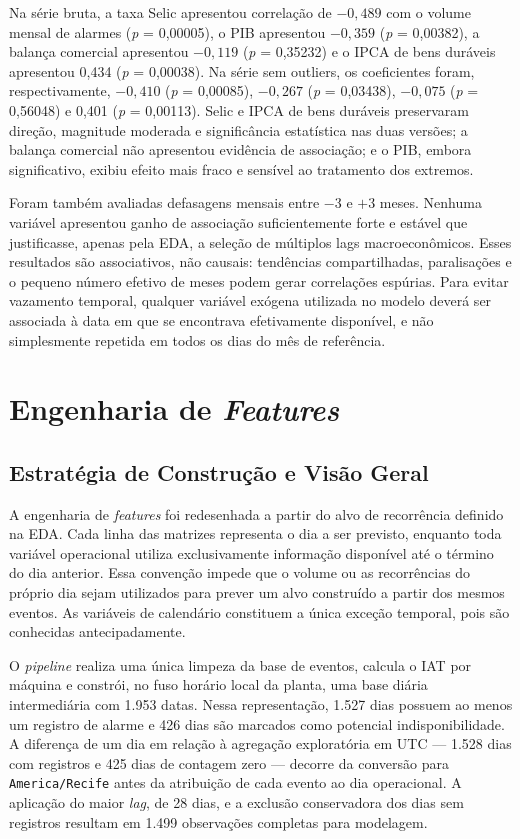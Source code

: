 Na série bruta, a taxa Selic apresentou correlação de $-0{,}489$ com o volume mensal de alarmes (\textit{p} = 0,00005), o PIB apresentou $-0{,}359$ (\textit{p} = 0,00382), a balança comercial apresentou $-0{,}119$ (\textit{p} = 0,35232) e o IPCA de bens duráveis apresentou 0,434 (\textit{p} = 0,00038). Na série sem outliers, os coeficientes foram, respectivamente, $-0{,}410$ (\textit{p} = 0,00085), $-0{,}267$ (\textit{p} = 0,03438), $-0{,}075$ (\textit{p} = 0,56048) e 0,401 (\textit{p} = 0,00113). Selic e IPCA de bens duráveis preservaram direção, magnitude moderada e significância estatística nas duas versões; a balança comercial não apresentou evidência de associação; e o PIB, embora significativo, exibiu efeito mais fraco e sensível ao tratamento dos extremos.

Foram também avaliadas defasagens mensais entre $-3$ e $+3$ meses. Nenhuma variável apresentou ganho de associação suficientemente forte e estável que justificasse, apenas pela EDA, a seleção de múltiplos lags macroeconômicos. Esses resultados são associativos, não causais: tendências compartilhadas, paralisações e o pequeno número efetivo de meses podem gerar correlações espúrias. Para evitar vazamento temporal, qualquer variável exógena utilizada no modelo deverá ser associada à data em que se encontrava efetivamente disponível, e não simplesmente repetida em todos os dias do mês de referência.


\section{Engenharia de \textit{Features}}
\label{sec:features}

\subsection{Estratégia de Construção e Visão Geral}

A engenharia de \textit{features} foi redesenhada a partir do alvo de recorrência definido na EDA. Cada linha das matrizes representa o dia a ser previsto, enquanto toda variável operacional utiliza exclusivamente informação disponível até o término do dia anterior. Essa convenção impede que o volume ou as recorrências do próprio dia sejam utilizados para prever um alvo construído a partir dos mesmos eventos. As variáveis de calendário constituem a única exceção temporal, pois são conhecidas antecipadamente.

O \textit{pipeline} realiza uma única limpeza da base de eventos, calcula o IAT por máquina e constrói, no fuso horário local da planta, uma base diária intermediária com 1.953 datas. Nessa representação, 1.527 dias possuem ao menos um registro de alarme e 426 dias são marcados como potencial indisponibilidade. A diferença de um dia em relação à agregação exploratória em UTC --- 1.528 dias com registros e 425 dias de contagem zero --- decorre da conversão para \texttt{America/Recife} antes da atribuição de cada evento ao dia operacional. A aplicação do maior \textit{lag}, de 28 dias, e a exclusão conservadora dos dias sem registros resultam em 1.499 observações completas para modelagem.

